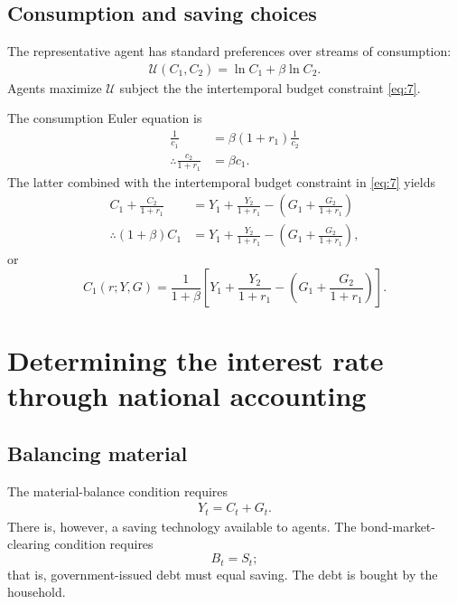 \documentclass[12pt]{pracjourn_rwr}
\theoremstyle{remark}
\begin{document}
\subsection{Consumption and saving choices}

The representative agent has standard preferences over streams of consumption:
\begin{align*}
\mathcal{U}(C_{1},C_{2}) = \ln C_{1} + \beta \ln C_{2}.
\end{align*}
Agents maximize $\mathcal{U}$ subject the the intertemporal budget constraint \eqref{eq:7}.

The consumption Euler equation is
\begin{align*}
\frac{1}{c_{1}} &= \beta (1+r_{1}) \frac{1}{c_{2}} \\
\therefore \frac{c_{2}}{1+r_{1}} &= \beta c_{1}.
\end{align*}
The latter combined with the intertemporal budget constraint in \eqref{eq:7} yields
\begin{align*}
C_{1} + \frac{C_{2}}{1+r_{1}} &= Y_{1} + \frac{Y_{2}}{1+r_{1}} - \left( G_{1} + \frac{G_{2}}{1+r_{1}} \right) \\
\therefore (1+\beta)C_{1} &= Y_{1} + \frac{Y_{2}}{1+r_{1}} - \left( G_{1} + \frac{G_{2}}{1+r_{1}} \right),
\end{align*}
or
\begin{equation}
\label{eq:8}
C_{1}(r;Y,G) = \frac{1}{1+\beta} \left[ Y_{1} + \frac{Y_{2}}{1+r_{1}} - \left( G_{1} + \frac{G_{2}}{1+r_{1}} \right) \right].
\end{equation}


\section{Determining the interest rate through national accounting}

\subsection{Balancing material}
The material-balance condition requires
\begin{align*}
Y_{t} = C_{t} + G_{t}.
\end{align*}
There is, however, a saving technology available to agents.
The bond-market-clearing condition requires
\begin{equation}
\label{eq:9}
B_{t} = S_{t};
\end{equation}
that is, government-issued debt must equal saving.
The debt is bought by the household.
\end{document}
